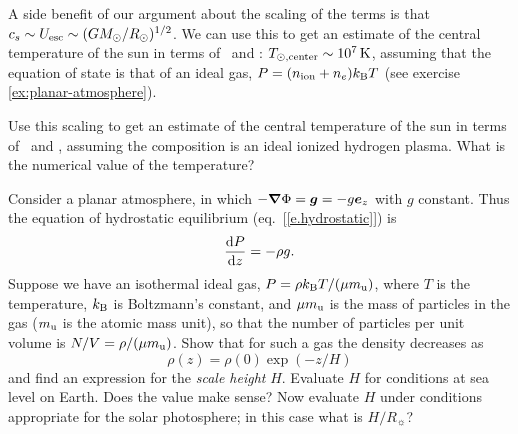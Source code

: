 A side benefit of our argument about the scaling of the terms is that $c_{s}\sim U_{\mathrm{esc}} \sim (GM_\odot/R_{\odot})^{1/2}$.  We can use this to get an estimate of the central temperature of the sun in terms of \Msun\ and \Rsun: $T_{\odot,\mathrm{center}}\sim 10^{7}\,\mathrm{K}$, assuming that the equation of state is that of an ideal gas, $P = (n_{\mathrm{ion}} + n_{e})k_\mathrm{B} T$ (see exercise \ref{ex:planar-atmosphere}). 

\begin{exercisebox}
Use this scaling to get an estimate of the central temperature of the sun in terms of \Msun\ and \Rsun, assuming the composition is an ideal ionized hydrogen plasma.  What is the numerical value of the temperature?
\end{exercisebox}

\begin{exercisebox}\label{ex:planar-atmosphere}
Consider a planar atmosphere, in which $-\bm{\nabla}\Phi = \bm{g} = -g \bm{e}_{z}$ with $g$ constant. Thus the equation of hydrostatic equilibrium (eq.~[\ref{e.hydrostatic}]) is
\begin{equation}\label{e.planar-hydrostatic}
\frac{\mathrm{d} P}{\mathrm{d} z} = -\rho g.
\end{equation}
Suppose we have an isothermal ideal gas, $P = \rho k_\mathrm{B} T/(\mu m_\mathrm{u})$, where $T$ is the temperature, $k_\mathrm{B}$ is Boltzmann's constant, and $\mu m_\mathrm{u}$ is the mass of particles in the gas ($m_\mathrm{u}$ is the atomic mass unit), so that the number of particles per unit volume is $N/V = \rho/(\mu m_\mathrm{u})$.  Show that for such a gas the density decreases as
\[
\rho(z) = \rho(0) \exp\left(-z/H\right)
\]
and find an expression for the \emph{scale height} $H$.  Evaluate $H$ for conditions at sea level on Earth. Does the value make sense? Now evaluate $H$ under conditions appropriate for the solar photosphere; in this case what is $H/R_{\sun}$?
\end{exercisebox}


